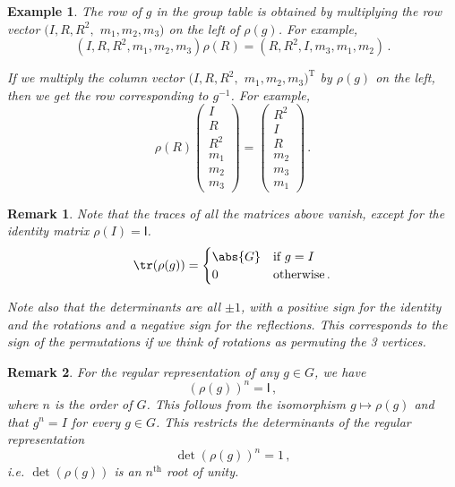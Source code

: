 \documentclass{article}
\theoremstyle{plain}\theoremheaderfont{\normalfont\itshape}\theorembodyfont{\rmfamily}\theoremseparator{.}\newtheorem*{rem}{Remark}\newtheorem*{ex}{Example}\newtheorem*{proof}{Proof}\newtheorem*{altp}{Alternative proof}
\theoremstyle{plain}\theoremheaderfont{\normalfont\bfseries}\theorembodyfont{\rmfamily}\theoremseparator{.}\newtheorem{thm}{Theorem}[section]\newtheorem{lem}[thm]{Lemma}\newtheorem{prop}[thm]{Proposition}\newtheorem*{cor}{Corollary}\newtheorem{defn}[thm]{Definition}\newtheorem{clm}[thm]{Claim}\newtheorem{clminproof}{Claim}
\theoremstyle{break}\theoremheaderfont{\normalfont\itshape}\theorembodyfont{\rmfamily}\theoremseparator{.\medskip}\newtheorem*{proofskip}{Proof}\newtheorem*{exs}{Examples}\newtheorem*{rems}{Remarks}
\theoremstyle{break}\theoremheaderfont{\normalfont\bfseries}\theorembodyfont{\rmfamily}\theoremseparator{.\medskip}\newtheorem{lemskip}[thm]{Lemma}\newtheorem{defnskip}[thm]{Definition}\newtheorem{propskip}[thm]{Proposition}\newtheorem{thmskip}[thm]{Theorem}
\numberwithin{equation}{section}
\newcommand{\tp}{^\mathrm{T}}
\begin{document}
\begin{ex}
		The row of \(g\) in the group table is obtained by multiplying the row vector \((I, R, R^2,\) \(m_1, m_2, m_3)\) on the left of \(\rho(g)\). For example,
		\[(I,R,R^2,m_1,m_2,m_3)\rho(R)=(R,R^2,I,m_3,m_1,m_2)\,.\]

		If we multiply the column vector \((I, R, R^2,\) \(m_1, m_2, m_3)\tp\) by \(\rho(g)\) on the left, then we get the row corresponding to \(g^{-1}\). For example,
		\[\rho(R)\begin{pmatrix}
			I \\ R \\ R^2 \\ m_1 \\ m_2 \\ m_3
		\end{pmatrix}=\begin{pmatrix}
			R^2 \\ I \\ R \\ m_2 \\ m_3 \\ m_1
		\end{pmatrix}\,.\]
	\end{ex}
	\begin{rem}
		Note that the traces of all the matrices above vanish, except for the identity matrix \(\rho(I)=\mathsf{I}\).
		\[\tr(\rho(g))=\begin{cases}
			\abs{G} & \text{if }g=I\\
			0 & \text{otherwise}\,.
		\end{cases}\]

		Note also that the determinants are all \(\pm 1\), with a positive sign for the identity and the rotations and a negative sign for the reflections. This corresponds to the sign of the permutations if we think of rotations as permuting the 3 vertices.
	\end{rem}
	\begin{rem}
		For the regular representation of any \(g\in G\), we have
		\[(\rho(g))^n=\mathsf{I}\,,\]
		where \(n\) is the order of \(G\). This follows from the isomorphism \(g\mapsto \rho(g)\) and that \(g^n=I\) for every \(g\in G\). This restricts the determinants of the regular representation
		\[\det(\rho(g))^n=1\,,\]
		i.e. \(\det(\rho(g))\) is an \(n^{\text{th}}\) root of unity.
	\end{rem}
\end{document}
